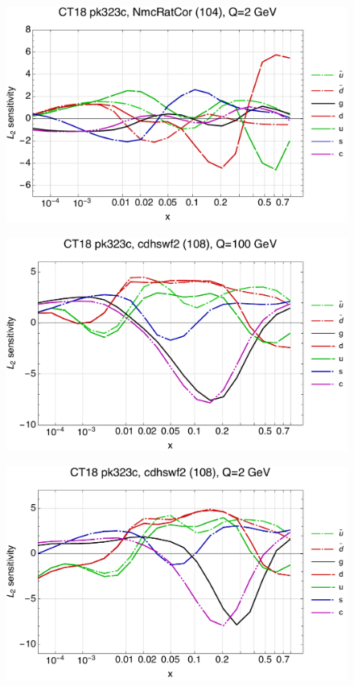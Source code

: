 \documentclass[10pt,aps,prd,floatfix,titlepage]{revtex4}
\begin{document}
\begin{figure}
\includegraphics[width=\textwidth,height=0.44\textheight,keepaspectratio]{1/104_ct18nn_L2_q2_Sf_1.pdf}
\caption{}
\end{figure}
\clearpage
\begin{figure}
\includegraphics[width=\textwidth,height=0.44\textheight,keepaspectratio]{1/108_ct18nn_L2_q100_Sf_1.pdf}
\caption{}
\end{figure}
\begin{figure}
\includegraphics[width=\textwidth,height=0.44\textheight,keepaspectratio]{1/108_ct18nn_L2_q2_Sf_1.pdf}
\caption{}
\end{figure}
\end{document}

